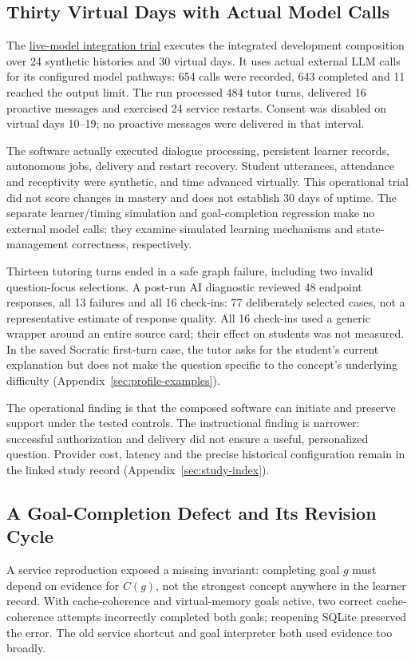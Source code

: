 \subsection{Thirty Virtual Days with Actual Model Calls}
\label{sec:provider-study}
The \hyperref[study-G]{live-model integration trial} executes the integrated development composition over 24 synthetic
histories and 30 virtual days. It uses actual external LLM calls for its
configured model pathways: 654 calls were recorded, 643 completed and 11
reached the output limit. The run processed 484 tutor turns, delivered 16 proactive
messages and exercised 24 service restarts. Consent was disabled on virtual
days 10--19; no proactive messages were delivered in that interval.

The software actually executed dialogue processing, persistent learner records,
autonomous jobs, delivery and restart recovery. Student utterances, attendance and receptivity were synthetic, and time
advanced virtually. This operational trial did not score changes in mastery
and does not establish 30 days of uptime. The separate learner/timing simulation
and goal-completion regression make no external model calls; they examine
simulated learning mechanisms and state-management correctness, respectively.

Thirteen tutoring turns ended in a safe graph failure, including two invalid
question-focus selections. A post-run AI diagnostic reviewed 48 endpoint
responses, all 13 failures and all 16 check-ins: 77 deliberately selected cases,
not a representative estimate of response quality. All 16 check-ins used a
generic wrapper around an entire source card; their effect on students was
not measured. In the saved Socratic first-turn
case, the tutor asks for the student's current explanation but does not make
the question specific to the concept's underlying difficulty
(Appendix~\ref{sec:profile-examples}).

The operational finding is that the composed software can initiate and preserve
support under the tested controls. The instructional finding is narrower:
successful authorization and delivery did not ensure a useful, personalized
question. Provider cost, latency and the precise historical configuration remain
in the linked study record (Appendix~\ref{sec:study-index}).

\subsection{A Goal-Completion Defect and Its Revision Cycle}
\label{sec:goal-study}
A service reproduction exposed a missing invariant: completing goal $g$ must
depend on evidence for $C(g)$, not the strongest concept anywhere in the learner
record. With cache-coherence and virtual-memory goals active, two correct
cache-coherence attempts incorrectly completed both goals; reopening SQLite
preserved the error. The old service shortcut and goal interpreter both used
evidence too broadly.

